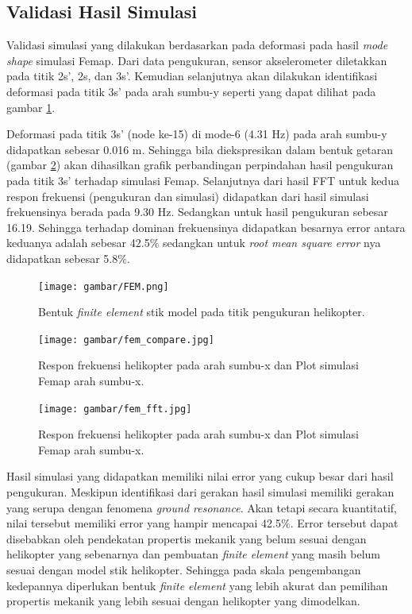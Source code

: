 \subsection{Validasi Hasil Simulasi}

Validasi simulasi yang dilakukan berdasarkan pada deformasi pada hasil \textit{mode shape} simulasi Femap. Dari data pengukuran, sensor akselerometer diletakkan pada titik 2s', 2s, dan 3s'. Kemudian selanjutnya akan dilakukan identifikasi deformasi pada titik 3s' pada arah sumbu-y seperti yang dapat dilihat pada gambar \ref{fig:FEM_pengukuran}.

Deformasi pada titik 3s' (node ke-15) di mode-6 (4.31 Hz) pada arah sumbu-y didapatkan sebesar 0.016 m. Sehingga bila diekspresikan dalam bentuk getaran (gambar \ref{fig:fem_validation_time_domain}) akan dihasilkan grafik perbandingan perpindahan hasil pengukuran pada titik 3s' terhadap simulasi Femap. Selanjutnya dari hasil FFT untuk kedua respon frekuensi (pengukuran dan simulasi) didapatkan dari hasil simulasi frekuensinya berada pada 9.30 Hz. Sedangkan untuk hasil pengukuran sebesar 16.19. Sehingga terhadap dominan frekuensinya didapatkan besarnya error antara keduanya adalah sebesar 42.5$\%$ sedangkan untuk \textit{root mean square error} nya didapatkan sebesar 5.8$\%$. 

\begin{figure}[H]
	\centering
	\texttt{[image: gambar/FEM.png]}
	\caption{Bentuk \textit{finite element} stik model pada titik pengukuran helikopter.}
	\label{fig:FEM_pengukuran}
\end{figure}

\begin{figure}[H]
	\centering
	\texttt{[image: gambar/fem\_compare.jpg]}
	\caption{Respon frekuensi helikopter pada arah sumbu-x dan Plot simulasi Femap arah sumbu-x.}
	\label{fig:fem_validation_time_domain}
\end{figure}

\begin{figure}[H]
	\centering
	\texttt{[image: gambar/fem\_fft.jpg]}
	\caption{Respon frekuensi helikopter pada arah sumbu-x dan Plot simulasi Femap arah sumbu-x.}
	\label{fig:fem_fft}
\end{figure}

Hasil simulasi yang didapatkan memiliki nilai error yang cukup besar dari hasil pengukuran. Meskipun identifikasi dari gerakan hasil simulasi memiliki gerakan yang serupa dengan fenomena \textit{ground resonance}. Akan tetapi secara kuantitatif, nilai tersebut memiliki error yang hampir mencapai 42.5$\%$. Error tersebut dapat disebabkan oleh pendekatan propertis mekanik yang belum sesuai dengan helikopter yang sebenarnya dan pembuatan \textit{finite element} yang masih belum sesuai dengan model stik helikopter. Sehingga pada skala pengembangan kedepannya diperlukan bentuk \textit{finite element} yang lebih akurat dan pemilihan propertis mekanik yang lebih sesuai dengan helikopter yang dimodelkan.
